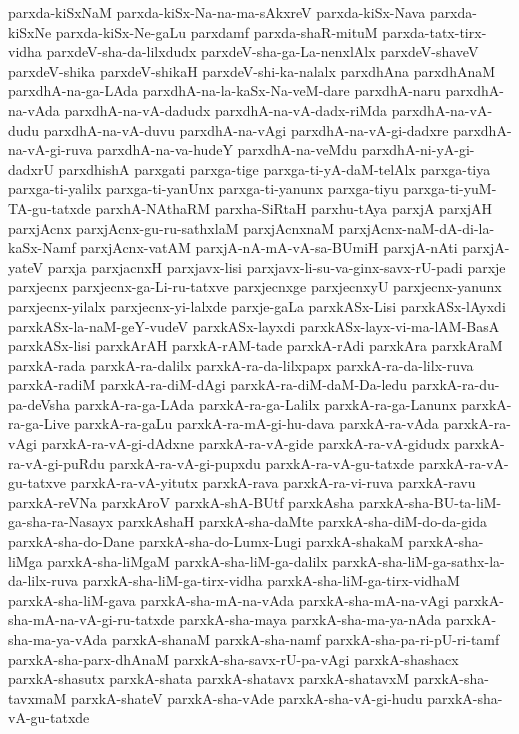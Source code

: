 {parxda-kiSxNaM
parxda-kiSx-Na-na-ma-sAkxreV
parxda-kiSx-Nava
parxda-kiSxNe
parxda-kiSx-Ne-gaLu
parxdamf
parxda-shaR-mituM
parxda-tatx-tirx-vidha
parxdeV-sha-da-lilxdudx
parxdeV-sha-ga-La-nenxlAlx
parxdeV-shaveV
parxdeV-shika
parxdeV-shikaH
parxdeV-shi-ka-nalalx
parxdhAna
parxdhAnaM
parxdhA-na-ga-LAda
parxdhA-na-la-kaSx-Na-veM-dare
parxdhA-naru
parxdhA-na-vAda
parxdhA-na-vA-dadudx
parxdhA-na-vA-dadx-riMda
parxdhA-na-vA-dudu
parxdhA-na-vA-duvu
parxdhA-na-vAgi
parxdhA-na-vA-gi-dadxre
parxdhA-na-vA-gi-ruva
parxdhA-na-va-hudeY
parxdhA-na-veMdu
parxdhA-ni-yA-gi-dadxrU
parxdhishA
parxgati
parxga-tige
parxga-ti-yA-daM-telAlx
parxga-tiya
parxga-ti-yalilx
parxga-ti-yanUnx
parxga-ti-yanunx
parxga-tiyu
parxga-ti-yuM-TA-gu-tatxde
parxhA-NAthaRM
parxha-SiRtaH
parxhu-tAya
parxjA
parxjAH
parxjAcnx
parxjAcnx-gu-ru-sathxlaM
parxjAcnxnaM
parxjAcnx-naM-dA-di-la-kaSx-Namf
parxjAcnx-vatAM
parxjA-nA-mA-vA-sa-BUmiH
parxjA-nAti
parxjA-yateV
parxja
parxjacnxH
parxjavx-lisi
parxjavx-li-su-va-ginx-savx-rU-padi
parxje
parxjecnx
parxjecnx-ga-Li-ru-tatxve
parxjecnxge
parxjecnxyU
parxjecnx-yanunx
parxjecnx-yilalx
parxjecnx-yi-lalxde
parxje-gaLa
parxkASx-Lisi
parxkASx-lAyxdi
parxkASx-la-naM-geY-vudeV
parxkASx-layxdi
parxkASx-layx-vi-ma-lAM-BasA
parxkASx-lisi
parxkArAH
parxkA-rAM-tade
parxkA-rAdi
parxkAra
parxkAraM
parxkA-rada
parxkA-ra-dalilx
parxkA-ra-da-lilxpapx
parxkA-ra-da-lilx-ruva
parxkA-radiM
parxkA-ra-diM-dAgi
parxkA-ra-diM-daM-Da-ledu
parxkA-ra-du-pa-deVsha
parxkA-ra-ga-LAda
parxkA-ra-ga-Lalilx
parxkA-ra-ga-Lanunx
parxkA-ra-ga-Live
parxkA-ra-gaLu
parxkA-ra-mA-gi-hu-dava
parxkA-ra-vAda
parxkA-ra-vAgi
parxkA-ra-vA-gi-dAdxne
parxkA-ra-vA-gide
parxkA-ra-vA-gidudx
parxkA-ra-vA-gi-puRdu
parxkA-ra-vA-gi-pupxdu
parxkA-ra-vA-gu-tatxde
parxkA-ra-vA-gu-tatxve
parxkA-ra-vA-yitutx
parxkA-rava
parxkA-ra-vi-ruva
parxkA-ravu
parxkA-reVNa
parxkAroV
parxkA-shA-BUtf
parxkAsha
parxkA-sha-BU-ta-liM-ga-sha-ra-Nasayx
parxkAshaH
parxkA-sha-daMte
parxkA-sha-diM-do-da-gida
parxkA-sha-do-Dane
parxkA-sha-do-Lumx-Lugi
parxkA-shakaM
parxkA-sha-liMga
parxkA-sha-liMgaM
parxkA-sha-liM-ga-dalilx
parxkA-sha-liM-ga-sathx-la-da-lilx-ruva
parxkA-sha-liM-ga-tirx-vidha
parxkA-sha-liM-ga-tirx-vidhaM
parxkA-sha-liM-gava
parxkA-sha-mA-na-vAda
parxkA-sha-mA-na-vAgi
parxkA-sha-mA-na-vA-gi-ru-tatxde
parxkA-sha-maya
parxkA-sha-ma-ya-nAda
parxkA-sha-ma-ya-vAda
parxkA-shanaM
parxkA-sha-namf
parxkA-sha-pa-ri-pU-ri-tamf
parxkA-sha-parx-dhAnaM
parxkA-sha-savx-rU-pa-vAgi
parxkA-shashacx
parxkA-shasutx
parxkA-shata
parxkA-shatavx
parxkA-shatavxM
parxkA-sha-tavxmaM
parxkA-shateV
parxkA-sha-vAde
parxkA-sha-vA-gi-hudu
parxkA-sha-vA-gu-tatxde
}
